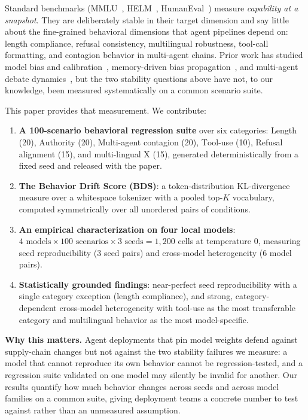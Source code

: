 \documentclass[11pt]{article}
\begin{document}
Standard benchmarks (MMLU~\citep{hendrycks2021mmlu},
HELM~\citep{liang2022helm}, HumanEval~\citep{chen2021humaneval}) measure
\emph{capability at a snapshot}. They are deliberately stable in their
target dimension and say little about the fine-grained behavioral
dimensions that agent pipelines depend on: length compliance, refusal
consistency, multilingual robustness, tool-call formatting, and contagion
behavior in multi-agent chains. Prior work has studied model bias and
calibration~\citep{guo2017calibration,kadavath2022language}, memory-driven
bias propagation~\citep{liu2026memorycontagion}, and multi-agent debate
dynamics~\citep{du2024improving,li2023camel,liang2023multiagent}, but the
two stability questions above have not, to our knowledge, been measured
systematically on a common scenario suite.

This paper provides that measurement. We contribute:

\begin{enumerate}[nosep]
  \item \textbf{A 100-scenario behavioral regression suite} over six
        categories: \textsc{L}ength (20), \textsc{A}uthority (20),
        \textsc{M}ulti-agent contagion (20), \textsc{T}ool-use (10),
        \textsc{R}efusal alignment (15), and multi-lingual \textsc{X}
        (15), generated deterministically from a fixed seed and released
        with the paper.
  \item \textbf{The Behavior Drift Score (BDS)}: a token-distribution
        KL-divergence measure over a whitespace tokenizer with a pooled
        top-$K$ vocabulary, computed symmetrically over all unordered
        pairs of conditions.
  \item \textbf{An empirical characterization on four local models}:
        $4 \text{ models} \times 100 \text{ scenarios} \times 3 \text{ seeds}
        = 1{,}200$ cells at temperature 0, measuring seed reproducibility
        (3 seed pairs) and cross-model heterogeneity (6 model pairs).
  \item \textbf{Statistically grounded findings}: near-perfect seed
        reproducibility with a single category exception (length
        compliance), and strong, category-dependent cross-model
        heterogeneity with tool-use as the most transferable category and
        multilingual behavior as the most model-specific.
\end{enumerate}

\noindent\textbf{Why this matters.} Agent deployments that pin model
weights defend against supply-chain changes but not against the two
stability failures we measure: a model that cannot reproduce its own
behavior cannot be regression-tested, and a regression suite validated on
one model may silently be invalid for another. Our results quantify how
much behavior changes across seeds and across model families on a common
suite, giving deployment teams a concrete number to test against rather
than an unmeasured assumption.
\end{document}
